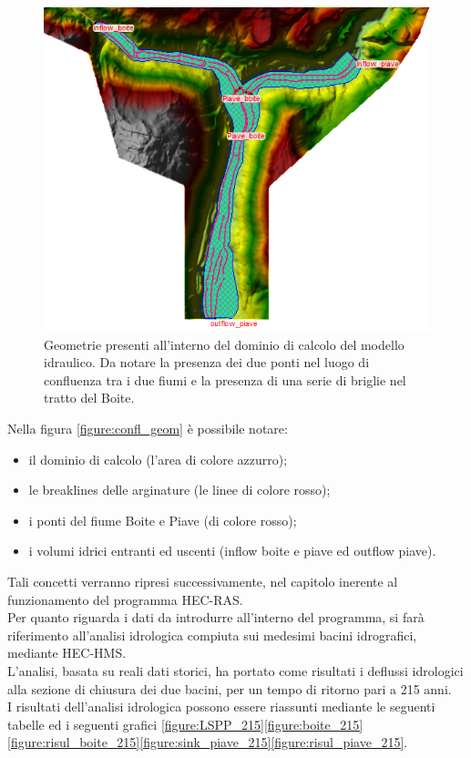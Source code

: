 \begin{figure}[H] \centering
\includegraphics[scale=0.7]{immagini/confl_geom.PNG}
\caption{Geometrie presenti all'interno del dominio di calcolo del modello idraulico. Da notare la presenza dei due ponti nel luogo di confluenza tra i due fiumi e la presenza di una serie di briglie nel tratto del Boite.}
\label{figure:confl_geom}    
\end{figure}
Nella figura \eqref{figure:confl_geom} è possibile notare:
\begin{itemize}
    \item il dominio di calcolo (l'area di colore azzurro);
    \item le breaklines delle arginature (le linee di colore rosso);
    \item i ponti del fiume Boite e Piave (di colore rosso);
    \item i volumi idrici entranti ed uscenti (inflow boite e piave ed outflow piave).
\end{itemize}
Tali concetti verranno ripresi successivamente, nel capitolo inerente al funzionamento del programma HEC-RAS.\\
Per quanto riguarda i dati da introdurre all'interno del programma, si farà riferimento all'analisi idrologica compiuta sui medesimi bacini idrografici, mediante HEC-HMS.\\
L'analisi, basata su reali dati storici, ha portato come risultati i deflussi idrologici alla sezione di chiusura dei due bacini, per un tempo di ritorno pari a 215 anni.\\
I risultati dell'analisi idrologica possono essere riassunti mediante le seguenti tabelle ed i seguenti grafici \eqref{figure:LSPP_215}\eqref{figure:boite_215}\eqref{figure:risul_boite_215}\eqref{figure:sink_piave_215}\eqref{figure:risul_piave_215}.


